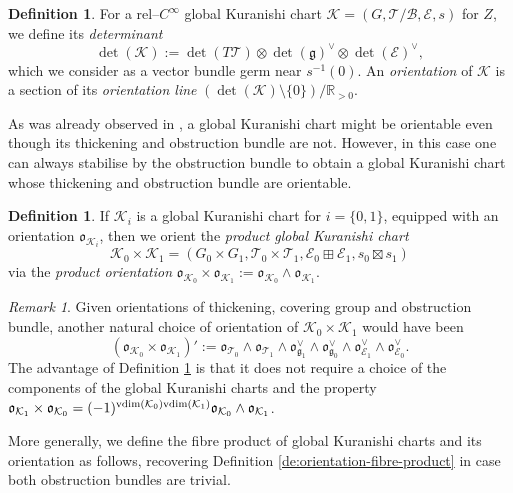 \documentclass[11pt,psamsfonts, oneside, reqno]{amsart}
\newcommand{\sm}{\ensuremath{\setminus}}%
\newcommand{\inv}{^{-1}}
\newcommand{\dul}{^\vee}
\newcommand{\vdim}{\normalfont\text{vdim}}
\newcommand{\bR}{\mathbb{R}}
\newcommand{\cB}{\mathcal{B}}
\newcommand{\cE}{\mathcal{E}}
\newcommand{\cK}{\mathcal{K}}
\newcommand{\cT}{\mathcal{T}}
\newcommand{\fg}{\mathfrak{g}}
\newcommand{\fo}{\mathfrak{o}}
\newcommand{\obs}{s}
\theoremstyle{definition}
\newtheorem{definition}[theorem]{Definition}
\theoremstyle{remark}
\newtheorem{remark}[theorem]{Remark}
\numberwithin{equation}{section}
\begin{document}
\begin{definition}\label{de:orientation-gkc} For a rel--$C^\infty$ global Kuranishi chart $\cK = (G,\cT/\cB,\cE,\obs)$ for $Z$, we define its \emph{determinant} 
	\begin{equation}\label{de:determinant-gck}\det(\cK) := \det(T\cT)\otimes \det(\fg)\dul \otimes\det(\cE)\dul,\end{equation}
	which we consider as a vector bundle germ near $\obs\inv(0)$. An \emph{orientation} of $\cK$ is a section of its \emph{orientation line} $(\det(\cK)\sm \{0\})/\bR_{> 0}$.
\end{definition}

\noindent
As was already observed in \cite{AMS21}, a global Kuranishi chart might be orientable even though its thickening and obstruction bundle are not. However, in this case one can always stabilise by the obstruction bundle to obtain a global Kuranishi chart whose thickening and obstruction bundle are orientable. 

\begin{definition}\label{de:product-orientation} If $\cK_i$ is a global Kuranishi chart for $i = \{0,1\}$, equipped with an orientation $\fo_{\cK_i}$, then we orient the \emph{product global Kuranishi chart} 
	$$\cK_0 \times\cK_1 = (G_0\times G_1,\cT_0\times\cT_1,\cE_0\boxplus \cE_1,\obs_0\boxtimes\obs_1)$$\noindent
	via the \emph{product orientation} $\fo_{\cK_0}\times\fo_{\cK_1} := \fo_{\cK_0}\wedge \fo_{\cK_1}$. 
\end{definition}

\begin{remark}\label{} Given orientations of thickening, covering group and obstruction bundle, another natural choice of orientation of $\cK_0\times\cK_1$ would have been 
	$$(\fo_{\cK_0}\times\fo_{\cK_1})' := \fo_{\cT_0}\wedge \fo_{\cT_1}\wedge \fo_{\fg_1}\dul \wedge \fo_{\fg_0}\dul \wedge \fo_{\cE_1}\dul \wedge \fo_{\cE_0}\dul.$$\noindent 
	The advantage of Definition \ref{de:product-orientation} is that it does not require a choice of the components of the global Kuranishi charts and the property $\fo_{\cK_1}\times \fo_{\cK_0} = (-1)^{\vdim(\cK_0)\vdim(\cK_1)}\fo_{\cK_0}\wedge \fo_{\cK_1}$. \end{remark}


\noindent
More generally, we define the fibre product of global Kuranishi charts and its orientation as follows, recovering  Definition \ref{de:orientation-fibre-product} in case both obstruction bundles are trivial.
\end{document}
